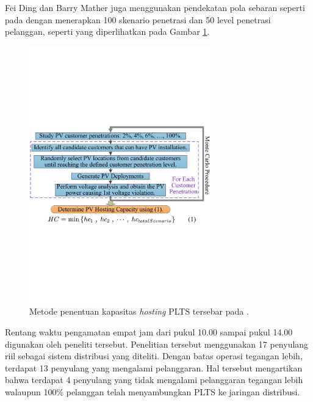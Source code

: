 {{{Fei Ding dan Barry Mather \cite{Ding2017} juga menggunakan pendekatan pola sebaran seperti pada \cite{Dubey2017} dengan menerapkan 100 skenario penetrasi dan 50 level penetrasi pelanggan, seperti yang diperlihatkan pada Gambar \ref{methodfeiding}.
\begin{figure}[!h]
	\centering
	\includegraphics[width=0.7\textwidth]{Fig/methodfeiding}
	\caption{Metode penentuan kapasitas \textit{hosting} PLTS tersebar pada \cite{Ding2017}.}
	\label{methodfeiding}
\end{figure}
Rentang waktu pengamatan empat jam dari pukul 10.00 sampai pukul 14.00 digunakan oleh peneliti tersebut. Penelitian tersebut menggunakan 17 penyulang riil sebagai sistem distribusi yang diteliti. Dengan batas operasi tegangan lebih, terdapat 13 penyulang yang mengalami pelanggaran. Hal tersebut mengartikan bahwa terdapat 4 penyulang yang tidak mengalami pelanggaran tegangan lebih walaupun  100\% pelanggan telah menyambungkan PLTS ke jaringan distribusi. 

}}}
